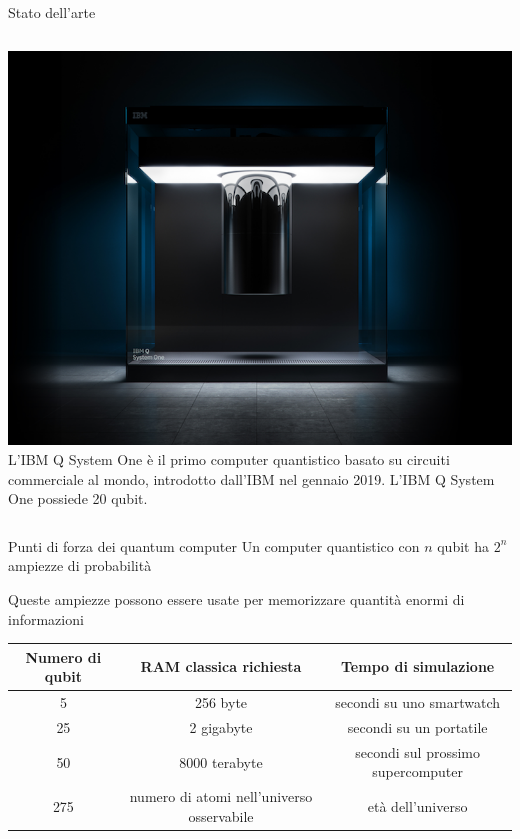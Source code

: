 \documentclass{beamer}
\begin{document}
    \begin{frame}{Stato dell'arte}
        \begin{columns}
            \includegraphics[width=\textwidth]{gfx/ibm_q_system_one.png}
            L'IBM Q System One è il primo computer quantistico basato su circuiti commerciale al mondo, 
            introdotto dall'IBM nel gennaio 2019. L'IBM Q System One possiede 20 qubit. 
        \end{columns}
    \end{frame}

    \begin{frame}{Punti di forza dei quantum computer}
        Un computer quantistico con $n$ qubit ha $2^n$ ampiezze di probabilità

        Queste ampiezze possono essere usate per memorizzare quantità enormi di informazioni

        \begin{tabular}{ccc}
            Numero di qubit & RAM classica richiesta & Tempo di simulazione \\ \hline
            5 & 256 byte & secondi su uno smartwatch \\ 
            25 & 2 gigabyte & secondi su un portatile \\ 
            50 & 8000 terabyte & secondi sul prossimo supercomputer \\ 
            275 & numero di atomi nell'universo osservabile & età dell'universo
        \end{tabular}
    \end{frame}
\end{document}
